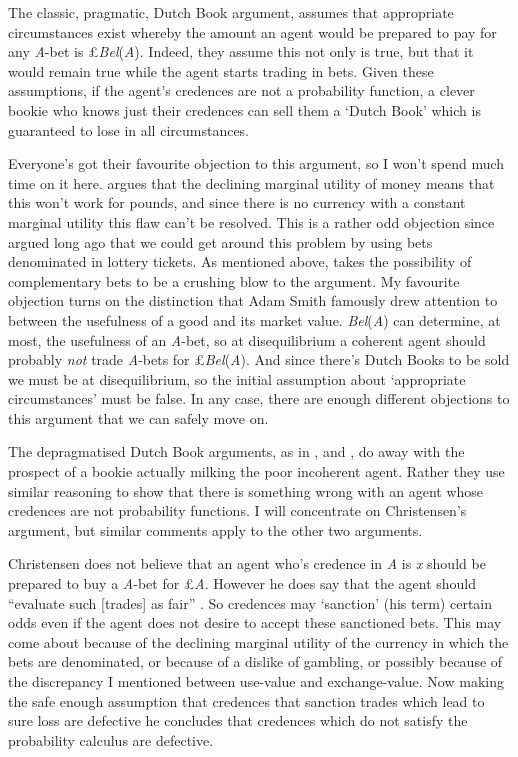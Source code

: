 The classic, pragmatic, Dutch Book argument, assumes that appropriate circumstances exist whereby the amount an agent would be prepared to pay for any \textit{A}\nobreakdash-bet is \pounds\textit{Bel}(\textit{A}). Indeed, they assume this not only is true, but that it would remain true while the agent starts trading in bets. Given these assumptions, if the agent's credences are not a probability function, a clever bookie who knows just their credences can sell them a `Dutch Book' which is guaranteed to lose in all circumstances.

Everyone's got their favourite objection to this argument, so I won't spend much time on it here. \citet[98]{Maher1993} argues that the declining marginal utility of money means that this won't work for pounds, and since there is no currency with a constant marginal utility this flaw can't be resolved. This is a rather odd objection since \citet{Savage1954} argued long ago that we could get around this problem by using bets denominated in lottery tickets. As mentioned above, \citet{Schick1986} takes the possibility of complementary bets to be a crushing blow to the argument. My favourite objection turns on the distinction that Adam Smith famously drew attention to between the usefulness of a good and its market value. \textit{Bel}(\textit{A}) can determine, at most, the usefulness of an \textit{A}\nobreakdash-bet, so at disequilibrium a coherent agent should probably \textit{not} trade \textit{A}\nobreakdash-bets for \pounds\textit{Bel}(\textit{A}). And since there's Dutch Books to be sold we must be at disequilibrium, so the initial assumption about `appropriate circumstances' must be false. In any case, there are enough different objections to this argument that we can safely move on.


The depragmatised Dutch Book arguments, as in \citet{HowsonUrbach1989}, \citet{Christensen1996} and \citet{Hellman1997}, do away with the prospect of a bookie actually milking the poor incoherent agent. Rather they use similar reasoning to show that there is something wrong with an agent whose credences are not probability functions. I will concentrate on Christensen's argument, but similar comments apply to the other two arguments. 

Christensen does not believe that an agent who's credence in \textit{A} is \textit{x} should be prepared to buy a \textit{A}\nobreakdash-bet for \pounds\textit{A}. However he does say that the agent should ``evaluate such [trades] as fair'' \citep[456]{Christensen1996}. So credences may `sanction' (his term) certain odds even if the agent does not desire to accept these sanctioned bets. This may come about because of the declining marginal utility of the currency in which the bets are denominated, or because of a dislike of gambling, or possibly because of the discrepancy I mentioned between use-value and exchange-value. Now making the safe enough assumption that credences that sanction trades which lead to sure loss are defective he concludes that credences which do not satisfy the probability calculus are defective. 

